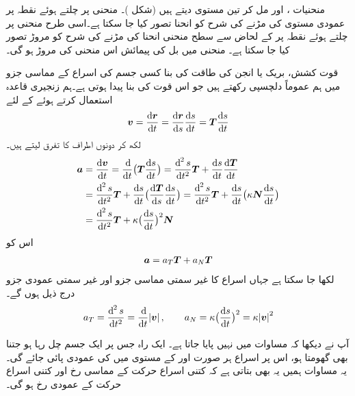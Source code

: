 منحنیات ،  اور   مل کر تین  مستوی دیتے ہیں (شکل )۔ منحنی پر چلتے ہوئے   نقطہ  پر عمودی مستوی کی  مڑنے کی شرح  کو   انحنا   تصور کیا جا سکتا ہے۔اسی طرح  منحنی پر چلتے ہوئے نقطہ  پر  کے لحاض سے    سطح منحنی انحنا کی مڑنے کی شرح کو مروڑ  تصور کیا جا سکتا ہے۔  منحنی میں بل کی  پیمائش اس منحنی کی  مروڑ ہو گی۔


قوت کشش، بریک  یا انجن کی طاقت کی بنا کسی جسم کی اسراع کے مماسی جزو میں ہم عموماً دلچسپی رکھتے ہیں جو اس قوت کی بنا پیدا ہوتی ہے۔ہم زنجیری قاعدہ استعمال کرتے ہوئے  کے لئے
\begin{align*}
\kvec{v}=\frac{\dif\kvec{r}}{\dif t}=\frac{\dif\kvec{r}}{\dif s}\frac{\dif s}{\dif t}=\kvec{T}\frac{\dif s}{\dif t}
\end{align*}
لکھ   کر دونوں اطراف کا تفرق  لیتے ہیں۔
\begin{align*}
\kvec{a}&=\frac{\dif\kvec{v}}{\dif t}=\frac{\dif}{\dif t}\big(\kvec{T}\frac{\dif s}{\dif t}\big)=\frac{\dif^{\,2}s}{\dif t^2}\kvec{T}+\frac{\dif s}{\dif t}\frac{\dif \kvec{T}}{\dif t}\\
&=\frac{\dif^{\,2}s}{\dif t^2}\kvec{T}+\frac{\dif s}{\dif t}\big(\frac{\dif\kvec{T}}{\dif s}\frac{\dif s}{\dif t}\big)=\frac{\dif^{\,2}s}{\dif t^2}\kvec{T}+\frac{\dif s}{\dif t}\big(\kappa \kvec{N}\frac{\dif s}{\dif t}\big)\\
&=\frac{\dif^{\,2}s}{\dif t^2}\kvec{T}+\kappa\big(\frac{\dif s}{\dif t}\big)^2\kvec{N}
\end{align*}
اس کو
\begin{align}\label{مساوات_سمتی_تفاعل_اسراع_الف}
{\ensuremath{{\boldsymbol{a}}}}=a_T{{\boldsymbol{T}}}+a_N{{\boldsymbol{T}}}
\end{align}
لکھا جا سکتا ہے جہاں اسراع کا غیر سمتی مماسی جزو   اور غیر سمتی عمودی جزو   درج ذیل ہوں گے۔
\begin{align}\label{مساوات_سمتی_تفاعل_اسراع_ب}
a_T=\frac{\dif^{\,2}s}{\dif t^2}=\frac{\dif}{\dif t}\abs{\kvec{v}},\quad\quad  a_N=\kappa\big(\frac{\dif s}{\dif t}\big)^2=\kappa\abs{\kvec{v}}^2
\end{align}

آپ نے دیکھا کہ مساوات  میں  نہیں پایا جاتا ہے۔ ایک راہ جس پر ایک جسم چل رہا ہو جتنا بھی گھومتا ہو، اس پر اسراع ہر صورت   اور 
  کے مستوی میں  کی عمودی  پائی جائے گی۔یہ مساوات ہمیں یہ بھی بتاتی ہے کہ کتنی اسراع حرکت کے مماسی رخ   اور کتنی اسراع حرکت کے عمودی رخ  ہو گی۔ 


